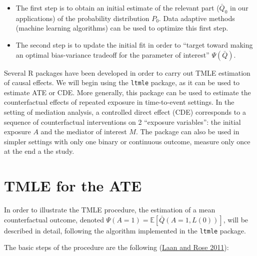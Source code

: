 \documentclass[
]{book}
\providecommand{\tightlist}{%
  \setlength{\itemsep}{0pt}\setlength{\parskip}{0pt}}
\begin{document}
\begin{itemize}
\tightlist
\item
  The first step is to obtain an initial estimate of the relevant part (\(\bar{Q}_0\) in our applications) of the probability distribution \(P_0\). Data adaptive methods (machine learning algorithms) can be used to optimize this first step.
\item
  The second step is to update the initial fit in order to ``target toward making an optimal bias-variance tradeoff for the parameter of interest'' \(\Psi(\bar{Q})\).
\end{itemize}

Several R packages have been developed in order to carry out TMLE estimation of causal effects. We will begin using the \texttt{ltmle} package, as it can be used to estimate ATE or CDE. More generally, this package can be used to estimate the counterfactual effects of repeated exposure in time-to-event settings. In the setting of mediation analysis, a controlled direct effect (CDE) corresponds to a sequence of counterfactual interventions on 2 ``exposure variables'': the initial exposure \(A\) and the mediator of interest \(M\). The package can also be used in simpler settings with only one binary or continuous outcome, measure only once at the end a the study.

\hypertarget{tmle-for-the-ate}{%
\section{TMLE for the ATE}\label{tmle-for-the-ate}}

In order to illustrate the TMLE procedure, the estimation of a mean counterfactual outcome, denoted \(\Psi(A=1) = \mathbb{E} \left[\bar{Q}(A=1,L(0))\right]\), will be described in detail, following the algorithm implemented in the \texttt{ltmle} package.

The basic steps of the procedure are the following (\protect\hyperlink{ref-vanderlaan_book2011}{Laan and Rose 2011}):
\end{document}
